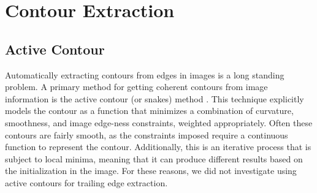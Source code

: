 

\section{Contour Extraction}

\subsection{Active Contour}

Automatically extracting contours from edges in images is a long standing problem. 
A primary method for getting coherent contours from image information is the active contour (or snakes) method \cite{amini1988using, kass1988snakes}.
This technique explicitly models the contour as a function that minimizes a combination of curvature, smoothness, and image edge-ness constraints, weighted appropriately.
Often these contours are fairly smooth, as the constraints imposed require a continuous function to represent the contour.
Additionally, this is an iterative process that is subject to local minima, meaning that it can produce different results based on the initialization in the image.
For these reasons, we did not investigate using active contours for trailing edge extraction.

